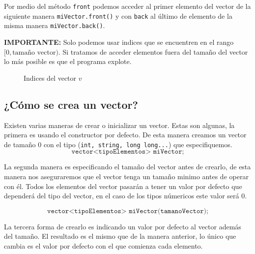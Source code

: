 \documentclass{article}
\begin{document}
    Por medio del método \texttt{front} podemos acceder al primer elemento del vector de la siguiente manera 
    \texttt{miVector.front()} y con \texttt{back} al último de elemento de la misma manera \texttt{miVector.back()}.

    \textbf{IMPORTANTE:} Solo podemos usar indices que se encuentren en el rango $[0, \text{tamaño vector})$.
    Si tratamos de acceder elementos fuera del tamaño del vector lo más posible es que el programa explote.

    \begin{figure}[h]
        \centering
        \caption{Indices del vector $v$}
    \end{figure}

    \subsection{¿Cómo se crea un vector?}

    Existen varias maneras de crear o inicializar un vector. Estas son algunas, la primera es usando el constructor
    por defecto. De esta manera creamos un vector de tamaño 0 con el tipo (\texttt{int, string, long long...}) que especifiquemos.
    $$\texttt{vector<tipoElementos> miVector;}$$

    La segunda manera es especificando el tamaño del vector antes de crearlo, de esta manera nos aseguraremos que el vector
    tenga un tamaño minimo antes de operar con él. Todos los elementos del vector pasarán a tener un valor por defecto
    que dependerá del tipo del vector, en el caso de los tipos númericos este valor será 0.

    $$\texttt{vector<tipoElementos> miVector(tamanoVector);}$$

    La tercera forma de crearlo es indicando un valor por defecto al vector además del tamaño. El resultado es el mismo
    que de la manera anterior, lo único que cambia es el valor por defecto con el que comienza cada elemento. 
\end{document}
